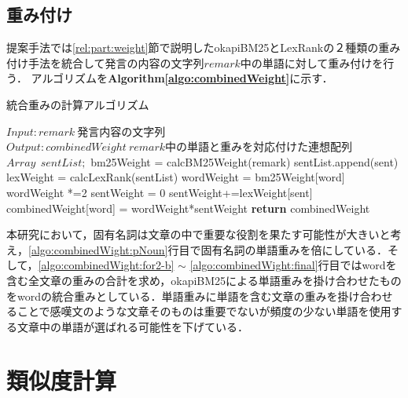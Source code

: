 \subsection{重み付け}
\label{impl:preProcessing:weight}
提案手法では\ref{rel:part:weight}節で説明したokapiBM25とLexRankの２種類の重み付け手法を統合して発言の内容の文字列$remark$中の単語に対して重み付けを行う．
アルゴリズムを\textbf{Algorithm\ref{algo:combinedWeight}}に示す．
\begin{algorithm}
\caption{統合重みの計算アルゴリズム} \label{algo:combinedWeight}
\begin{algorithmic}[1]
\State $Input: remark  ~ 発言内容の文字列$
\State $Output:  combinedWeight ~ remark中の単語と重みを対応付けた連想配列$
\State $Array ~~ sentList;$ 
	\State bm25Weight = calcBM25Weight(remark)\label{algo:combinedWight:bm25}
		\State sentList.append(sent)
	\EndFor
	\State lexWeight = calcLexRank(sentList)
	 \label{algo:combinedWight:for1-b}
	 	\State wordWeight = bm25Weight[word]
			\State wordWeight *=2\label{algo:combinedWight:pNoun}
		\EndIf
		\State sentWeight = 0
		\label{algo:combinedWight:for2-b}
				\State sentWeight+=lexWeight[sent]
			\EndIf
		\EndFor\label{algo:combinedWight:for2-e}
		\State combinedWeight[word] = wordWeight*sentWeight \label{algo:combinedWight:final}
	 \EndFor\label{algo:combinedWeight:for1-e}
	\State \textbf{return} combinedWeight
\EndProcedure
\end{algorithmic}
\end{algorithm}

本研究において，固有名詞は文章の中で重要な役割を果たす可能性が大きいと考え，\ref{algo:combinedWight:pNoun}行目で固有名詞の単語重みを倍にしている．そして，\ref{algo:combinedWight:for2-b} $\sim$ \ref{algo:combinedWight:final}行目ではwordを含む全文章の重みの合計を求め，okapiBM25による単語重みを掛け合わせたものをwordの統合重みとしている．単語重みに単語を含む文章の重みを掛け合わせることで感嘆文のような文章そのものは重要でないが頻度の少ない単語を使用する文章中の単語が選ばれる可能性を下げている．\\
\section{類似度計算}
\label{impl:similarity}
